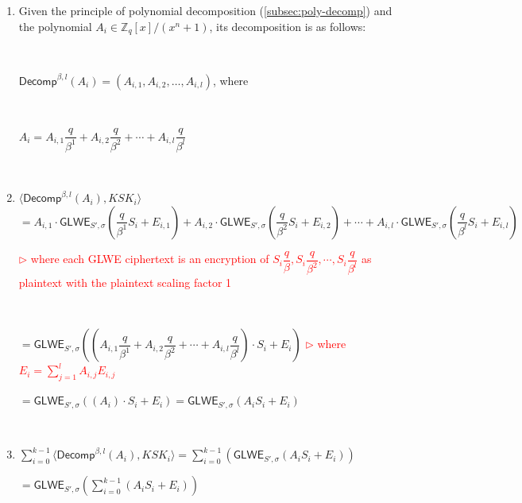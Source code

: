 \begin{myproof}

\begin{enumerate}
\item Given the principle of polynomial decomposition (\autoref{subsec:poly-decomp}) and the polynomial $A_i \in \mathbb{Z}_q[x] / (x^n + 1)$, its decomposition is as follows: 

$ $

$\textsf{Decomp}^{\beta, l}(A_i) = (A_{ i,1 }, A_{ i,2 }, \ldots, A_{ i,l })$, where

$ $

$A_i = A_{ i, 1 } \dfrac{q}{\beta^1} + A _{ i, 2 }\dfrac{q}{\beta^2} + \cdots + A_{ i, l } \dfrac{q}{\beta^l}  $

$ $

\item $\langle \textsf{Decomp}^{\beta, l}(A_i), \mathit{KSK}_i \rangle $ \\
$ =  A_{ i,1 } \cdot \textsf{GLWE}_{S', \sigma} \left ( 
 \dfrac{q}{\beta^1}S_i + E_{i, 1} \right ) + A_{ i,2 } \cdot \textsf{GLWE}_{S', \sigma} \left ( 
 \dfrac{q}{\beta^2}S_i  + E_{i, 2} \right ) + \cdots + A_{ i,l } \cdot \textsf{GLWE}_{S', \sigma} \left ( 
 \dfrac{q}{\beta^l}S_i  + E_{i, l} \right ) $ 

\textcolor{red}{ $\rhd$ where each \textsf{GLWE} ciphertext is an encryption of $S_i\dfrac{q}{\beta}, S_i\dfrac{q}{\beta^2}, \cdots, S_i\dfrac{q}{\beta^l}$ as plaintext with the plaintext scaling factor 1}

$ $
 
$= \textsf{GLWE}_{S', \sigma} \left ( 
 \left ( A_{ i,1 } \dfrac{q}{\beta^1} + A_{ i,2 } \dfrac{q}{\beta^2} + \cdots + A_{ i,l } \dfrac{q}{\beta^l} \right ) \cdot S_i + E_i \right )$ \textcolor{red}{ $\rhd$ where $E_i = \sum\limits_{j=1}^{l} A_{ i, j } E_{i, j}$}

 
$= \textsf{GLWE}_{S', \sigma} \left ( 
 \left ( A_i \right ) \cdot S_i + E_i \right ) = \textsf{GLWE}_{S', \sigma} ( 
 A_i  S_i  + E_i) $ 

$ $
 
 \item $\sum \limits_{i=0}^{k-1} \langle \textsf{Decomp}^{\beta, l}(A_i), \mathit{KSK}_i \rangle = \sum \limits_{i=0}^{k-1} (\textsf{GLWE}_{S', \sigma} ( 
 A_i  S_i  + E_i)) $ 
 
 $= \textsf{GLWE}_{S', \sigma} \left ( \sum \limits_{i=0}^{k-1}  
 (A_i  S_i   + E_i) \right ) $

$ $
 

\end{enumerate}
\end{myproof}
